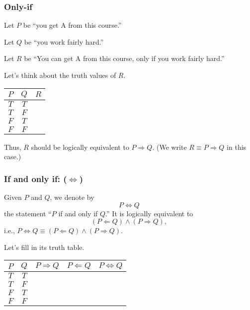 \documentclass{beamer}
\begin{document}
\begin{frame}\frametitle{Only-if}
  Let $P$ be ``you get A from this course.''

  Let $Q$ be ``you work fairly hard.''
  
  Let $R$ be ``You can get A from this course, only if you work fairly hard.''

  Let's think about the truth values of $R$.
  
  \begin{tcolorbox}[title=Only if you work fairly hard.]
    \begin{tabular}{|c|c||c|}
      \hline
      $P$ & $Q$ & $R$ \\
      \hline
      $T$ & $T$ & \\
      $T$ & $F$ & \\
      $F$ & $T$ & \\
      $F$ & $F$ & \\
      \hline
    \end{tabular}
  \end{tcolorbox}
  \pause

  Thus, $R$ should be logically equivalent to $P\Rightarrow Q$.  (We
  write $R\equiv P\Rightarrow Q$ in this case.)
\end{frame}

\begin{frame}\frametitle{If and only if: ($\Leftrightarrow$)}
  Given $P$ and $Q$, we denote by
  \[ P\Leftrightarrow Q \]
  the statement ``$P$ if and only if $Q$.''
  \pause
  It is logically equivalent to
  \[ (P\Leftarrow Q)\wedge (P\Rightarrow Q), \]
  i.e., $P\Leftrightarrow Q \equiv (P\Leftarrow Q)\wedge (P\Rightarrow Q)$.

  Let's fill in its truth table.
  \begin{tcolorbox}
    \begin{tabular}{|c|c||c|c|c|}
      \hline
      $P$ & $Q$ & $P\Rightarrow Q$ & $P\Leftarrow Q$ & $P\Leftrightarrow Q$ \\
      \hline
      $T$ & $T$ & & & \\
      $T$ & $F$ & & & \\
      $F$ & $T$ & & & \\
      $F$ & $F$ & & & \\
      \hline
    \end{tabular}
  \end{tcolorbox}
\end{frame}
\end{document}
